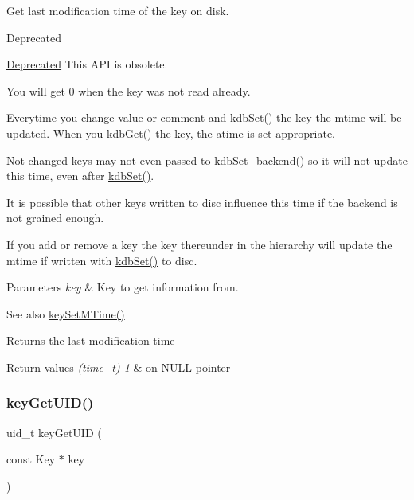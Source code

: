 Get last modification time of the key on disk. 

\begin{DoxyRefDesc}{Deprecated}
\item[\hyperlink{deprecated__deprecated000023}{Deprecated}]This A\+PI is obsolete.\end{DoxyRefDesc}


You will get 0 when the key was not read already.

Everytime you change value or comment and \hyperlink{group__kdb_ga11436b058408f83d303ca5e996832bcf}{kdb\+Set()} the key the mtime will be updated. When you \hyperlink{group__kdb_ga28e385fd9cb7ccfe0b2f1ed2f62453a1}{kdb\+Get()} the key, the atime is set appropriate.

Not changed keys may not even passed to kdb\+Set\+\_\+backend() so it will not update this time, even after \hyperlink{group__kdb_ga11436b058408f83d303ca5e996832bcf}{kdb\+Set()}.

It is possible that other keys written to disc influence this time if the backend is not grained enough.

If you add or remove a key the key thereunder in the hierarchy will update the mtime if written with \hyperlink{group__kdb_ga11436b058408f83d303ca5e996832bcf}{kdb\+Set()} to disc.


\begin{DoxyParams}{Parameters}
{\em key} & Key to get information from. \\
\hline
\end{DoxyParams}
\begin{DoxySeeAlso}{See also}
\hyperlink{group__meta_ga481d8997187992fe4bbf288bc8ef4db7}{key\+Set\+M\+Time()} 
\end{DoxySeeAlso}
\begin{DoxyReturn}{Returns}
the last modification time 
\end{DoxyReturn}

\begin{DoxyRetVals}{Return values}
{\em (time\+\_\+t)-\/1} & on N\+U\+LL pointer \\
\hline
\end{DoxyRetVals}
\mbox{\label{group__meta_gacaa5060e67b03f50ae49a3620c54bc46}} 
\subsubsection{\texorpdfstring{key\+Get\+U\+I\+D()}{keyGetUID()}}
{\footnotesize\ttfamily uid\+\_\+t key\+Get\+U\+ID (\begin{DoxyParamCaption}\item[{const Key $\ast$}]{key }\end{DoxyParamCaption})}



